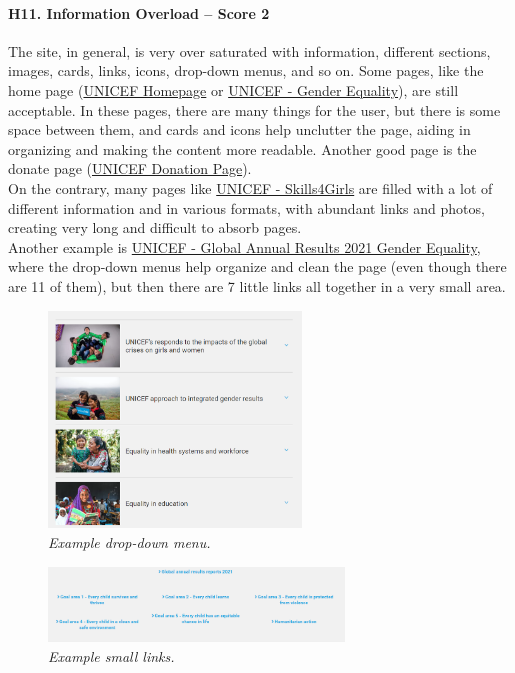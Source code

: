 \paragraph*{H11. Information Overload – Score 2}
The site, in general, is very over saturated with information, different sections, images, cards, links, icons, drop-down menus, and so on.
Some pages, like the home page (\href{https://www.unicef.org/}{UNICEF Homepage} or \href{https://www.unicef.org/gender-equality}{UNICEF - Gender Equality}), are still acceptable. In these pages, there are many things for the user, but there is some space between them, and cards and icons help unclutter the page, aiding in organizing and making the content more readable. Another good page is the donate page (\href{https://donazioni.unicef.it/}{UNICEF Donation Page}).\\
On the contrary, many pages like \href{https://www.unicef.org/gender-equality/skills4girls}{UNICEF - Skills4Girls} are filled with a lot of different information and in various formats, with abundant links and photos, creating very long and difficult to absorb pages.\\
Another example is \href{https://www.unicef.org/reports/global-annual-results-2021-gender-equality}{UNICEF - Global Annual Results 2021 Gender Equality}, where the drop-down menus help organize and clean the page (even though there are 11 of them), but then there are 7 little links all together in a very small area.
\begin{figure}[h]
	\centering
	\begin{center}
		\includegraphics[width=0.6\textwidth]{Picture15.png}
	\end{center}
	\captionsetup{font=small}
	\caption{\textit{Example drop-down menu.}}
	\label{fig:label15}
\end{figure}
\begin{figure}[h]
	\centering
	\begin{center}
		\includegraphics[width=0.7\textwidth]{Picture16.png}
	\end{center}
	\captionsetup{font=small}
	\caption{\textit{Example small links.}}
	\label{fig:label16}
\end{figure}

